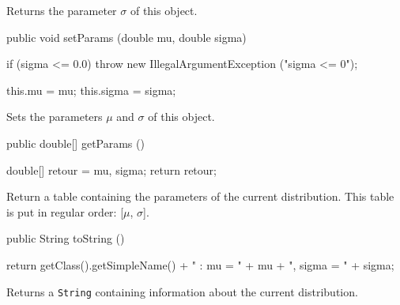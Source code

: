  \begin{tabb} Returns the parameter $\sigma$ of this object.
 \end{tabb}
\begin{code}

   public void setParams (double mu, double sigma)\begin{hide} {
      if (sigma <= 0.0)
         throw new IllegalArgumentException ("sigma <= 0");

      this.mu = mu;
      this.sigma = sigma;
   }\end{hide}
\end{code}
\begin{tabb}
   Sets the parameters $\mu$ and $\sigma$ of this object.
\end{tabb}
\begin{code}

   public double[] getParams ()\begin{hide} {
      double[] retour = {mu, sigma};
      return retour;
   }\end{hide}
\end{code}
\begin{tabb}
   Return a table containing the parameters of the current distribution.
   This table is put in regular order: [$\mu$, $\sigma$].
\end{tabb}
\begin{hide}\begin{code}

   public String toString ()\begin{hide} {
      return getClass().getSimpleName() + " : mu = " + mu + ", sigma = " + sigma;
   }\end{hide}
\end{code}
\begin{tabb}
   Returns a \texttt{String} containing information about the current distribution.
\end{tabb}\end{hide}
\begin{code}\begin{hide}
}\end{hide}
\end{code}
